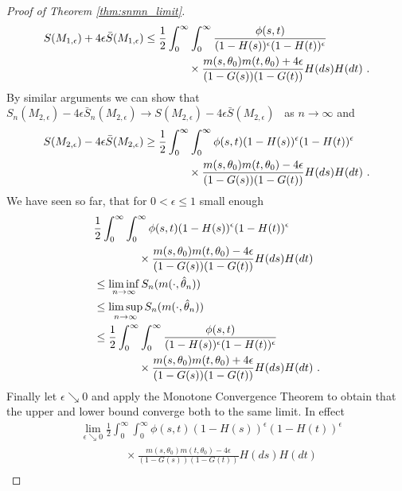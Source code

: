 \begin{proof}[Proof of Theorem \ref{thm:snmn_limit}]
\begin{align*}
		S(M_{1,\epsilon}) + 4\epsilon \bar{S}(M_{1,\epsilon}) &\leq \frac{1}{2}\int_{0}^{\infty} \int_{0}^{\infty} \frac{\phi(s,t)}{(1-H(s))^\epsilon(1-H(t))^\epsilon}\\
		&\qquad\qquad \times \frac{m(s,\theta_0)m(t,\theta_0) + 4\epsilon}{(1-G(s))(1-G(t))} H(ds)H(dt)\textrm{ .}
	\end{align*}
	By similar arguments we can show that $S_n(M_{2,\epsilon}) - 4\epsilon \bar{S}_n(M_{2,\epsilon}) \to S(M_{2,\epsilon}) - 4\epsilon \bar{S}(M_{2,\epsilon})$ \wpo\ as $n\to\infty$ and 
	\begin{align*}
		S(M_{2,\epsilon}) - 4\epsilon \bar{S}(M_{2,\epsilon}) &\geq \frac{1}{2}\int_{0}^{\infty} \int_{0}^{\infty} \phi(s,t)(1-H(s))^\epsilon(1-H(t))^\epsilon\\
		&\qquad\qquad \times \frac{m(s,\theta_0)m(t,\theta_0) - 4\epsilon}{(1-G(s))(1-G(t))} H(ds)H(dt)\textrm{ .}
	\end{align*}
	We have seen so far, that for $0<\epsilon\leq 1$ small enough
	\begin{align*}
		&\frac{1}{2}\int_{0}^{\infty} \int_{0}^{\infty} \phi(s,t)(1-H(s))^\epsilon(1-H(t))^\epsilon\\
		&\qquad\qquad \times \frac{m(s,\theta_0)m(t,\theta_0) - 4\epsilon}{(1-G(s))(1-G(t))} H(ds)H(dt)\\
		&\leq \liminf_{n\to\infty} S_n(m(\cdot, \hat\theta_n))\\
		&\leq \limsup_{n\to\infty} S_n(m(\cdot, \hat\theta_n))\\
		&\leq \frac{1}{2}\int_{0}^{\infty} \int_{0}^{\infty} \frac{\phi(s,t)}{(1-H(s))^\epsilon(1-H(t))^\epsilon}\\
		&\qquad\qquad \times \frac{m(s,\theta_0)m(t,\theta_0) + 4\epsilon}{(1-G(s))(1-G(t))} H(ds)H(dt)\textrm{ .}
	\end{align*}
	Finally let $\epsilon \searrow 0$ and apply the Monotone Convergence Theorem to obtain that the upper and lower bound converge both to the same limit. In effect
	\begin{align*}
		&\lim\limits_{\epsilon\searrow 0}\frac{1}{2}\int_{0}^{\infty} \int_{0}^{\infty} \phi(s,t)(1-H(s))^\epsilon(1-H(t))^\epsilon\\
		&\qquad\qquad \times \frac{m(s,\theta_0)m(t,\theta_0) - 4\epsilon}{(1-G(s))(1-G(t))} H(ds)H(dt)\\

\end{align*}
\end{proof}

